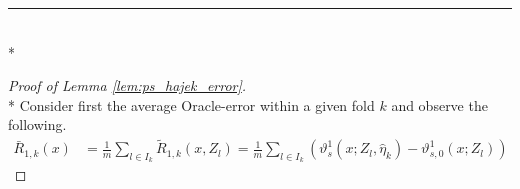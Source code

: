 \hrule

\begin{lem}\label{lem:ps_hajek_error}\mbox{}\\*
    
\end{lem}

\begin{proof}[Proof of Lemma \ref{lem:ps_hajek_error}]\mbox{}\\*
    Consider first the average Oracle-error within a given fold $k$ and observe the following.
    \begin{equation}
        \begin{aligned}
            \bar{R}_{1, k}\left(x\right)
            & = \frac{1}{m}\sum_{l \in I_{k}}\tilde{R}_{1, k}\left(x, Z_{l}\right)
            = \frac{1}{m}\sum_{l \in I_{k}}
            \left(\vartheta_{s}^{1}\left(x; Z_l, \hat{\eta}_{k}\right)
            - \vartheta_{s,0}^{1}\left(x; Z_l\right) 
            \right)
        \end{aligned}
    \end{equation}

\end{proof}
